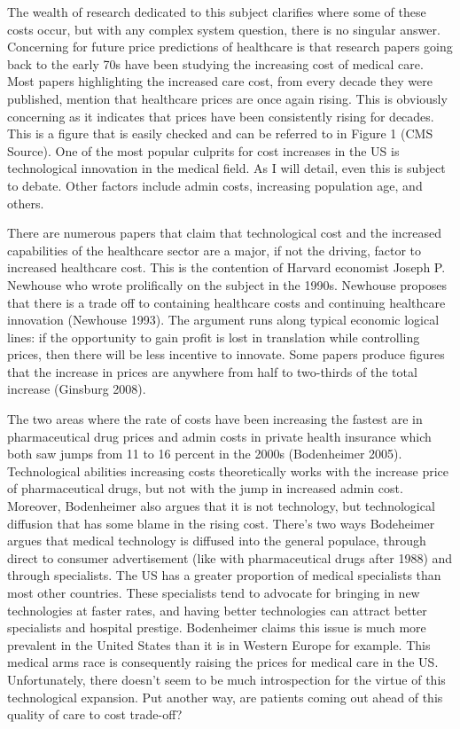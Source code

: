 \documentclass{article}
\begin{document}
The wealth of research dedicated to this subject clarifies where some of these costs occur, but with any complex system question, there is no singular answer. Concerning for future price predictions of healthcare is that research papers going back to the early 70s have been studying the increasing cost of medical care. Most papers highlighting the increased care cost, from every decade they were published, mention that healthcare prices are once again rising. This is obviously concerning as it indicates that prices have been consistently rising for decades. This is a figure that is easily checked and can be referred to in Figure 1 (CMS Source). One of the most popular culprits for cost increases in the US is technological innovation in the medical field. As I will detail, even this is subject to debate. Other factors include admin costs, increasing population age, and others. 

There are numerous papers that claim that technological cost and the increased capabilities of the healthcare sector are a major, if not the driving, factor to increased healthcare cost. This is the contention of Harvard economist Joseph P. Newhouse who wrote prolifically on the subject in the 1990s. Newhouse proposes that there is a trade off to containing healthcare costs and continuing healthcare innovation (Newhouse 1993). The argument runs along typical economic logical lines: if the opportunity to gain profit is lost in translation while controlling prices, then there will be less incentive to innovate. Some papers produce figures that the increase in prices are anywhere from half to two-thirds of the total increase (Ginsburg 2008). 

The two areas where the rate of costs have been increasing the fastest are in pharmaceutical drug prices and admin costs in private health insurance which both saw jumps from 11 to 16 percent in the 2000s (Bodenheimer 2005). Technological abilities increasing costs theoretically works with the increase price of pharmaceutical drugs, but not with the jump in increased admin cost. Moreover, Bodenheimer also argues that it is not technology, but technological diffusion that has some blame in the rising cost. There's two ways Bodeheimer argues that medical technology is diffused into the general populace, through direct to consumer advertisement (like with pharmaceutical drugs after 1988) and through specialists. The US has a greater proportion of medical specialists than most other countries. These specialists tend to advocate for bringing in new technologies at faster rates, and having better technologies can attract better specialists and hospital prestige. Bodenheimer claims this issue is much more prevalent in the United States than it is in Western Europe for example. This medical arms race is consequently raising the prices for medical care in the US. Unfortunately, there doesn't seem to be much introspection for the virtue of this technological expansion. Put another way, are patients coming out ahead of this quality of care to cost trade-off?
\end{document}
